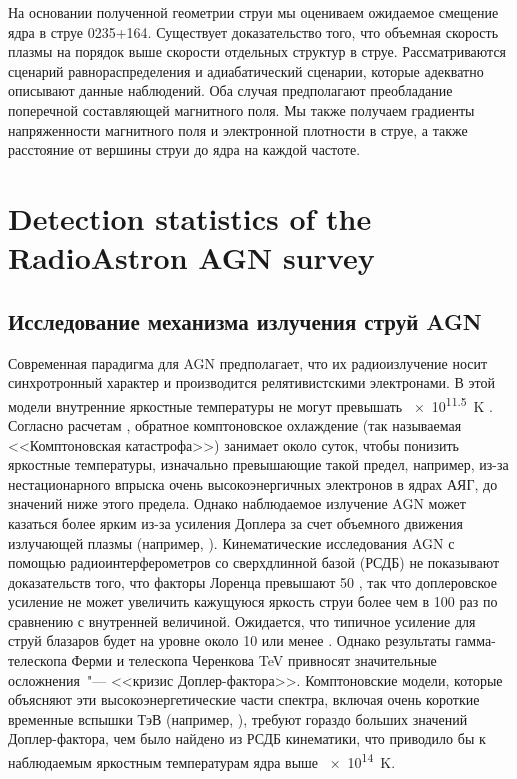 На основании полученной геометрии струи мы оцениваем ожидаемое смещение ядра в струе 0235+164.
Существует доказательство того, что объемная скорость плазмы на порядок выше скорости отдельных
структур в струе. Рассматриваются сценарий равнораспределения и адиабатический сценарии, которые
адекватно описывают данные наблюдений. Оба случая предполагают преобладание поперечной составляющей
магнитного поля. Мы также получаем градиенты напряженности магнитного поля и электронной плотности в
струе, а также расстояние от вершины струи до ядра на каждой частоте.


\section{Detection statistics of the RadioAstron AGN survey}

\subsection{Исследование механизма излучения струй AGN}

Современная парадигма для AGN предполагает, что их радиоизлучение носит синхротронный характер и
производится релятивистскими электронами. В этой модели внутренние яркостные температуры не могут
превышать \SI{e11.5}{\kelvin} \cite{Kellermann_1969,Readhead_1994}. Согласно расчетам
\cite{Readhead_1994}, обратное комптоновское охлаждение (так называемая <<Комптоновская
катастрофа>>) занимает около суток, чтобы понизить яркостные температуры, изначально превышающие
такой предел, например, из-за нестационарного впрыска очень высокоэнергичных электронов в ядрах АЯГ,
до значений ниже этого предела. Однако наблюдаемое излучение AGN может казаться более ярким из-за
усиления Доплера за счет объемного движения излучающей плазмы (например, \cite{Shklovskii_1964}).
Кинематические исследования AGN с помощью радиоинтерферометров со сверхдлинной базой (РСДБ) не
показывают доказательств того, что факторы Лоренца превышают 50 \cite{Cohen_2007}, так что
доплеровское усиление не может увеличить кажущуюся яркость струи более чем в 100 раз по сравнению с
внутренней величиной. Ожидается, что типичное усиление для струй блазаров будет на уровне около 10
или менее \cite{Lister_2016}. Однако результаты гамма-телескопа Ферми и телескопа Черенкова TeV
привносят значительные осложнения~"--- <<кризис Доплер-фактора>>. Комптоновские модели, которые
объясняют эти высокоэнергетические части спектра, включая очень короткие временные вспышки ТэВ
(например, \cite{Aharonian_2007,Albert_2007}), требуют гораздо больших значений Доплер-фактора, чем
было найдено из РСДБ кинематики, что приводило бы к наблюдаемым яркостным температурам ядра выше
\SI{e14}{\kelvin}.

